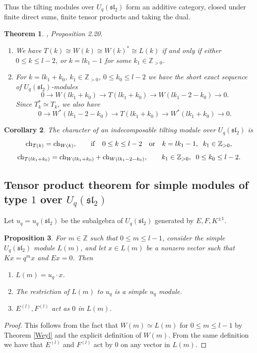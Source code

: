 \documentclass[11pt]{amsart}
\newcommand\lie[1]{\mathfrak{#1}}
\newcommand{\Z}{\mathbb{Z}}
\newcommand\on[1]{\rm{#1}}
\newtheorem{theorem}{Theorem}[section]
\newtheorem{corollary}[theorem]{Corollary}
\newtheorem{proposition}[theorem]{Proposition}
\begin{document}
Thus the tilting modules over $U_q(\lie{sl}_2)$ form an additive category, closed under finite direct sums, finite tensor products and taking the dual. 

\begin{theorem} \cite{AT}, \label{isomLW}
 Proposition 2.20. 
\label{tilt_prop2}
\begin{enumerate} 
\item We have $T(k) \cong W(k) \cong W(k)^* \cong L(k)$  if and only if either $ 0 \leq k \leq l-2$, or $k = lk_1 -1$ for some $k_1 \in \mathbb{Z}_{> 0}$. 
\item For $k = l k_1 + k_0$, $k_1 \in \mathbb{Z}_{> 0}$, $0 \leq k_0 \leq l-2$ we have the short exact sequence of  $U_q(\lie{sl}_2)$-modules
\[  0 \longrightarrow  W(lk_1+k_0 ) \longrightarrow T(lk_1 + k_0) \longrightarrow W(l k_1 -2 - k_0) \longrightarrow 0 .\] 
Since  $T_k^* \simeq T_k$, we also have  
\[  0 \longrightarrow  W^*(lk_1- 2 -k_0 ) \longrightarrow T(lk_1 + k_0) \longrightarrow W^*(l k_1 + k_0) \longrightarrow 0 .\] 
\end{enumerate} 
\end{theorem} 

\begin{corollary}  \label{tilt_char} 
The character of an indecomposable tilting module over $U_q(\lie{sl}_2)$  is 
\[  {\on{ch}}_{T(k)} = {\on{ch}}_{W(k)} , \quad \quad {\rm if} \quad  0 \leq k \leq l-2 \quad {\rm or} \quad k = lk_1-1, \;\; k_1 \in \mathbb{Z}_{> 0}, \]
\[  {\on{ch}}_{T(lk_1 + k_0)} = {\on{ch}}_{W(lk_1 + k_0)} + {\on{ch}}_{W(lk_1 - 2 - k_0)} , \quad \quad  k_1 \in \mathbb{Z}_{> 0}, \;\; 0 \leq k_0 \leq l-2.\] 
\end{corollary} 



\subsection{Tensor product theorem for simple modules of type $1$ over $U_q(\lie{sl}_2)$} \label{tpthm}
Let $u_q = u_q(\lie{sl}_2)$ be the subalgebra of $U_q(\lie{sl}_2)$ generated by $E,F, K^{\pm 1}$. 

\begin{proposition}  \label{Lm0} 
For $m \in \Z$ such that $0 \leq m \leq l-1$, consider the simple $U_q(\lie{sl}_2)$ module $L(m)$, and let $x \in L(m)$ 
be a nonzero vector such that $K x = q^m x$ and $Ex =0$. Then 
\begin{enumerate} 
\item $L(m) = u_q \cdot x$.  
\item The restriction of $L(m)$ to $u_q$ is a simple $u_q$ module. 
\item $E^{(l)} , F^{(l)}$ act as $0$ in $L(m)$. 
\end{enumerate} 
\end{proposition} 
\begin{proof} 
This follows from the fact that $W(m) \simeq L(m)$ for $0 \leq m \leq l-1$ by Theorem \ref{Weyl} and the explicit definition of $W(m)$. From the same definition we have that $E^{(l)}$ and $F^{(l)}$ act by $0$ on any vector in $L(m)$. 
\end{proof} 
\end{document}
